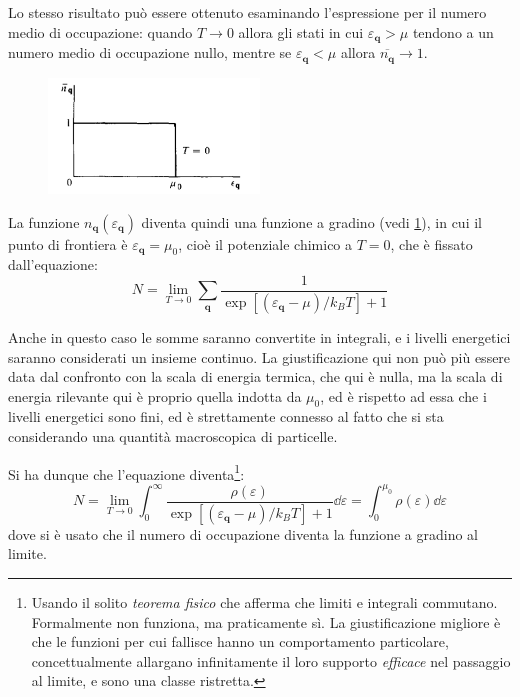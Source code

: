 Lo stesso risultato può essere ottenuto esaminando l'espressione per il numero medio di occupazione: quando $T\rightarrow 0$ allora gli stati in cui $\varepsilon_{\textbf{q}} > \mu$ tendono a un numero medio di occupazione nullo, mentre se $\varepsilon_{\textbf{q}} < \mu$ allora $\overline{n_{\textbf{q}}} \rightarrow 1$.

\begin{figure}[b]
	\centering
	\vspace*{-5pt}
	\includegraphics[width=0.5\textwidth]{Immagini/FermiStep.png}
	\vspace*{-5pt}
	\caption{}
	\label{fig:fermistep}
\end{figure}

La funzione $n_{\textbf{q}} (\varepsilon_{\textbf{q}})$ diventa quindi una funzione a gradino (vedi \cref{fig:fermistep}), in cui il punto di frontiera è $\varepsilon_{\textbf{q}} = \mu_0$, cioè il potenziale chimico a $T=0$, che è fissato dall'equazione:
\begin{equation*}
N = \lim_{T\rightarrow 0} \sum_{\textbf{q}} \frac{1}{\exp\left[(\varepsilon_{\textbf{q}} - \mu)/k_B T\right] + 1}
\end{equation*}

Anche in questo caso le somme saranno convertite in integrali, e i livelli energetici saranno considerati un insieme continuo. La giustificazione qui non può più essere data dal confronto con la scala di energia termica, che qui è nulla, ma la scala di energia rilevante qui è proprio quella indotta da $\mu_0$, ed è rispetto ad essa che i livelli energetici sono fini, ed è strettamente connesso al fatto che si sta considerando una quantità macroscopica di particelle.

Si ha dunque che l'equazione diventa\footnote{\label{note:physth} Usando il solito \textit{teorema fisico} che afferma che limiti e integrali commutano. Formalmente non funziona, ma praticamente sì. La giustificazione migliore è che le funzioni per cui fallisce hanno un comportamento particolare, concettualmente allargano infinitamente il loro supporto \textit{efficace} nel passaggio al limite, e sono una classe ristretta.}:
\begin{equation*}
N = \lim_{T\rightarrow 0} \int_{0}^{\infty} \frac{\rho(\varepsilon)}{\exp\left[(\varepsilon_{\textbf{q}} - \mu)/k_B T\right] + 1} \dd \varepsilon = \int_{0}^{\mu_0} \rho(\varepsilon) \dd \varepsilon
\end{equation*}
dove si è usato che il numero di occupazione diventa la funzione a gradino al limite.

